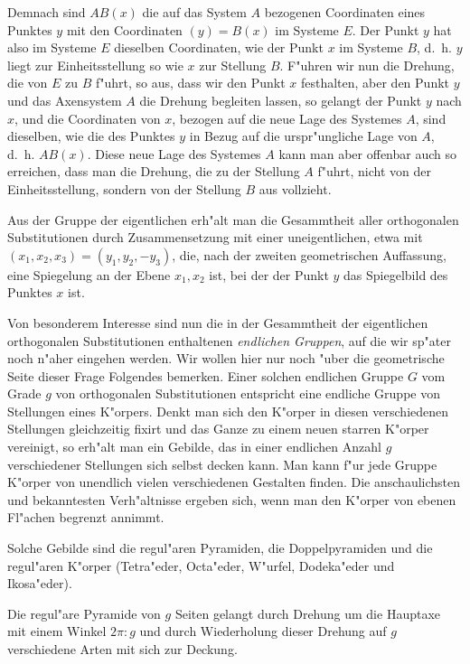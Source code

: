 \documentclass[12pt,a4paper]{article}
\theoremstyle{definition}
\begin{document}
Demnach sind $AB(x)$ die auf das System $A$ bezogenen Coordinaten eines Punktes $y$ mit den Coordinaten $(y) = B(x)$ im Systeme $E$. Der Punkt $y$ hat also im Systeme $E$ dieselben Coordinaten, wie der Punkt $x$ im Systeme $B$, d.~h. $y$ liegt zur Einheitsstellung so wie $x$ zur Stellung $B$. F"uhren wir nun die Drehung, die von $E$ zu $B$ f"uhrt, so aus, dass wir den Punkt $x$ festhalten, aber den Punkt $y$ und das Axensystem $A$ die Drehung begleiten lassen, so gelangt der Punkt $y$ nach $x$, und die Coordinaten von $x$, bezogen auf die neue Lage des Systemes $A$, sind dieselben, wie die des Punktes $y$ in Bezug auf die urspr"ungliche Lage von $A$, d.~h. $AB(x)$. Diese neue Lage des Systemes $A$ kann man aber offenbar auch so erreichen, dass man die Drehung, die zu der Stellung $A$ f"uhrt, nicht von der Einheitsstellung, sondern von der Stellung $B$ aus vollzieht.

Aus der Gruppe der eigentlichen erh"alt man die Gesammtheit aller orthogonalen Substitutionen durch Zusammensetzung mit einer uneigentlichen, etwa mit $(x_1, x_2, x_3) = (y_1, y_2, -y_3)$, die, nach der zweiten geometrischen Auffassung, eine Spiegelung an der Ebene $x_1, x_2$ ist, bei der der Punkt $y$ das Spiegelbild des Punktes $x$ ist.

Von besonderem Interesse sind nun die in der Gesammtheit der eigentlichen orthogonalen Substitutionen enthaltenen \emph{endlichen Gruppen}, auf die wir sp"ater noch n"aher eingehen werden. Wir wollen hier nur noch "uber die geometrische Seite dieser Frage Folgendes bemerken. Einer solchen endlichen Gruppe $G$ vom Grade $g$ von orthogonalen Substitutionen entspricht eine endliche Gruppe von Stellungen eines K"orpers. Denkt man sich den K"orper in diesen verschiedenen Stellungen gleichzeitig fixirt und das Ganze zu einem neuen starren K"orper vereinigt, so erh"alt man ein Gebilde, das in einer endlichen Anzahl $g$ verschiedener Stellungen sich selbst decken kann. Man kann f"ur jede Gruppe K"orper von unendlich vielen verschiedenen Gestalten finden. Die anschaulichsten und bekanntesten Verh"altnisse ergeben sich, wenn man den K"orper von ebenen Fl"achen begrenzt annimmt.

Solche Gebilde sind die regul"aren Pyramiden, die Doppelpyramiden und die regul"aren K"orper (Tetra"eder, Octa"eder, W"urfel, Dodeka"eder und Ikosa"eder).

Die regul"are Pyramide von $g$ Seiten gelangt durch Drehung um die Hauptaxe mit einem Winkel $2\pi:g$ und durch Wiederholung dieser Drehung auf $g$ verschiedene Arten mit sich zur Deckung.
\end{document}
